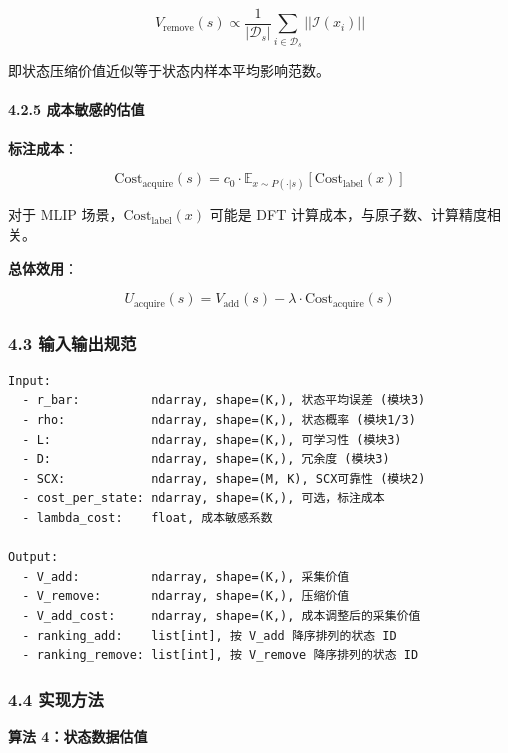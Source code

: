 \documentclass[
  12pt,
]{ctexart}
\begin{document}
\[
V_{\text{remove}}(s) \propto \frac{1}{|\mathcal{D}_s|} \sum_{i \in \mathcal{D}_s} ||\mathcal{I}(x_i)||
\]

即状态压缩价值近似等于状态内样本平均影响范数。

\paragraph{4.2.5
成本敏感的估值}\label{ux6210ux672cux654fux611fux7684ux4f30ux503c}

\textbf{标注成本}：

\[
\text{Cost}_{\text{acquire}}(s) = c_0 \cdot \mathbb{E}_{x \sim P(\cdot|s)}[\text{Cost}_{\text{label}}(x)]
\]

对于 MLIP 场景，\(\text{Cost}_{\text{label}}(x)\) 可能是 DFT
计算成本，与原子数、计算精度相关。

\textbf{总体效用}：

\[
U_{\text{acquire}}(s) = V_{\text{add}}(s) - \lambda \cdot \text{Cost}_{\text{acquire}}(s)
\]

\subsubsection{4.3
输入输出规范}\label{ux8f93ux5165ux8f93ux51faux89c4ux8303-3}

\begin{verbatim}
Input:
  - r_bar:          ndarray, shape=(K,), 状态平均误差 (模块3)
  - rho:            ndarray, shape=(K,), 状态概率 (模块1/3)
  - L:              ndarray, shape=(K,), 可学习性 (模块3)
  - D:              ndarray, shape=(K,), 冗余度 (模块3)
  - SCX:            ndarray, shape=(M, K), SCX可靠性 (模块2)
  - cost_per_state: ndarray, shape=(K,), 可选，标注成本
  - lambda_cost:    float, 成本敏感系数

Output:
  - V_add:          ndarray, shape=(K,), 采集价值
  - V_remove:       ndarray, shape=(K,), 压缩价值
  - V_add_cost:     ndarray, shape=(K,), 成本调整后的采集价值
  - ranking_add:    list[int], 按 V_add 降序排列的状态 ID
  - ranking_remove: list[int], 按 V_remove 降序排列的状态 ID
\end{verbatim}

\subsubsection{4.4 实现方法}\label{ux5b9eux73b0ux65b9ux6cd5-3}

\textbf{算法 4：状态数据估值}
\end{document}
